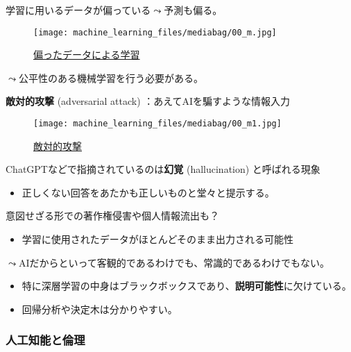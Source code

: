 \documentclass[
  xelatex,
  ja=standard]{bxjsarticle}
\providecommand{\tightlist}{%
  \setlength{\itemsep}{0pt}\setlength{\parskip}{0pt}}\usepackage{longtable,booktabs,array}
\begin{document}
学習に用いるデータが偏っている\(\leadsto\)予測も偏る。

\begin{figure}[htpb]

{\centering \texttt{[image: machine\_learning\_files/mediabag/00\_m.jpg]}

}

\caption{\href{https://gigazine.net/news/20200702-twitter-ai-machine-learning-racism/}{偏ったデータによる学習}}

\end{figure}

\(\leadsto\)公平性のある機械学習を行う必要がある。

\textbf{敵対的攻撃} (adversarial attack) ：あえてAIを騙すような情報入力

\begin{figure}[htpb]

{\centering \texttt{[image: machine\_learning\_files/mediabag/00\_m1.jpg]}

}

\caption{\href{https://gigazine.net/news/20211130-universal-naturalistic-adversarial-patches/}{敵対的攻撃}}

\end{figure}

ChatGPTなどで指摘されているのは\textbf{幻覚} (hallucination)
と呼ばれる現象

\begin{itemize}
\tightlist
\item
  正しくない回答をあたかも正しいものと堂々と提示する。
\end{itemize}

意図せざる形での著作権侵害や個人情報流出も？

\begin{itemize}
\tightlist
\item
  学習に使用されたデータがほとんどそのまま出力される可能性
\end{itemize}

\(\leadsto\)AIだからといって客観的であるわけでも、常識的であるわけでもない。

\begin{itemize}
\tightlist
\item
  特に深層学習の中身はブラックボックスであり、\textbf{説明可能性}に欠けている。
\item
  回帰分析や決定木は分かりやすい。
\end{itemize}

\hypertarget{ux4ebaux5de5ux77e5ux80fdux3068ux502bux7406}{%
\subsubsection{人工知能と倫理}\label{ux4ebaux5de5ux77e5ux80fdux3068ux502bux7406}}
\end{document}
